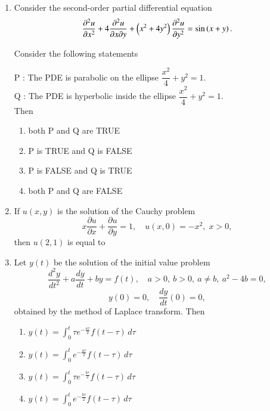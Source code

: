 \documentclass[journal,12pt,onecolumn]{IEEEtran}
\theoremstyle{remark}
\begin{document}
\begin{enumerate}[start=1, label=Q.\arabic*]
\hfill{}


\item Consider the second\mbox{-}order partial differential equation 
\[
\dfrac{\partial^{2}u}{\partial x^{2}}+4\dfrac{\partial^{2}u}{\partial x \partial y}+\left(x^{2}+4y^{2}\right)\dfrac{\partial^{2}u}{\partial y^{2}}=\sin\left(x+y\right).
\]

Consider the following statements\brak{:}

P : The PDE is parabolic on the ellipse $\dfrac{x^{2}}{4}+y^{2}=1$.\\
Q : The PDE is hyperbolic inside the ellipse $\dfrac{x^{2}}{4}+y^{2}=1$.\\

Then
\begin{enumerate}
\item both P and Q are TRUE
\item P is TRUE and Q is FALSE
\item P is FALSE and Q is TRUE
\item both P and Q are FALSE
\end{enumerate}

\hfill{}
\item If $u(x,y)$ is the solution of the Cauchy problem
\[
x\dfrac{\partial u}{\partial x}+\dfrac{\partial u}{\partial y}=1,\quad u(x,0)=-x^{2},\; x>0,
\]
then $u(2,1)$ is equal to
\begin{enumerate}
\end{enumerate}

\hfill{}


\item Let $y(t)$ be the solution of the initial value problem
\[
\dfrac{d^{2}y}{dt^{2}}+a\dfrac{dy}{dt}+by=f(t),\quad a>0,\ b>0,\ a\ne b,\ a^{2}-4b=0,
\]
\[
y(0)=0,\quad \dfrac{dy}{dt}(0)=0,
\]
obtained by the method of Laplace transform. Then
\begin{enumerate}
\item $y(t)=\int_{0}^{t}\tau e^{-\tfrac{a\tau}{2}}f(t-\tau)\,d\tau$
\item $y(t)=\int_{0}^{t}e^{-\tfrac{a\tau}{2}}f(t-\tau)\,d\tau$
\item $y(t)=\int_{0}^{t}\tau e^{-\tfrac{b\tau}{2}}f(t-\tau)\,d\tau$
\item $y(t)=\int_{0}^{t}e^{-\tfrac{b\tau}{2}}f(t-\tau)\,d\tau$
\end{enumerate}


\end{enumerate}
\end{document}
